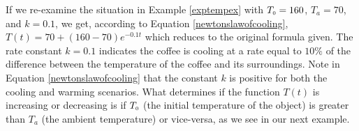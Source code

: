
\smallskip


\smallskip 

If we re-examine the situation in Example \ref{exptempex} with $T_{\mbox{\tiny$0$}} = 160$, $T_{a} = 70$, and $k = 0.1$, we get, according to Equation \ref{newtonslawofcooling}, $T(t) = 70 + (160 - 70)e^{-0.1t}$ which reduces to the original formula given.  The rate constant $k = 0.1$ indicates the coffee is cooling at a rate equal to $10 \%$ of the difference between the temperature of the coffee and its surroundings.  Note in Equation \ref{newtonslawofcooling} that the constant $k$ is positive for both the cooling and warming scenarios.  What determines if the function $T(t)$ is increasing or decreasing is if $T_{\mbox{\tiny$0$}}$ (the initial temperature of the object) is greater than $T_{a}$ (the ambient temperature) or vice-versa, as we see in our next example.

\medskip

